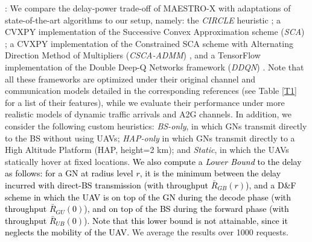 \documentclass[10pt, twocolumn]{IEEEtran}
\theoremstyle{plain}
\theoremstyle{definition}
\theoremstyle{remark}
\newcommand\hlt[1]{\textcolor{black}{#1}}
\begin{document}
{: We compare the delay-power trade-off of MAESTRO-X with adaptations of state-of-the-art algorithms to our setup, namely: the \emph{CIRCLE} heuristic \cite{MEC-DDPG}; a CVXPY implementation of the Successive Convex Approximation scheme (\emph{SCA}) \cite{SCA}; a CVXPY implementation of the Constrained SCA scheme with Alternating Direction Method of Multipliers (\emph{CSCA-ADMM}) \cite{CSCA-ADMM}, and a TensorFlow implementation of the Double Deep-Q Networks framework (\emph{DDQN}) \cite{DDQN}. Note that all these frameworks are optimized under their original channel and communication models detailed in the corresponding references (see Table \ref{T1} for a list of their features), while we evaluate their performance under more realistic models of dynamic traffic arrivals and A2G channels. In addition, we consider the following custom heuristics: \emph{BS-only}, in which GNs transmit directly to the BS without using UAVs; \emph{HAP-only} in which GNs transmit directly to a High Altitude Platform (HAP, height=2 km); and \emph{Static}, in which the UAVs statically hover at fixed locations.
\hlt{We also compute a \emph{Lower Bound} to the delay as follows:
for a GN at radius level $r$,
it is the minimum between the delay incurred with direct-BS transmission (with throughput $\bar{R}_{GB}(r)$), and a D\&F scheme in which the UAV is on top of the GN during the decode phase (with throughput $\bar{R}_{GU}(0)$), and
on top of the BS during the forward phase (with throughput $\bar{R}_{UB}(0)$). Note that this lower bound is not attainable, since it neglects the mobility of the UAV.}
We average the results over 1000 requests.

}
\end{document}
